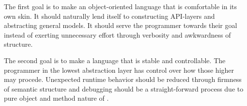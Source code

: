 The first goal is to make an object-oriented language that is comfortable
in its own skin. It should naturally lend itself to constructing API-layers
and abstracting general models. It should serve the programmer towards their
goal instead of exerting unnecessary effort through verbosity and awkwardness
of structure.


The second goal is to make a language that is stable and controllable.
The programmer in the lowest abstraction layer has control over how those
higher may procede. Unexpected runtime behavior should be reduced through
firmness of semantic structure and debugging should be a straight-forward
process due to pure object and method nature of \Lang{}.
